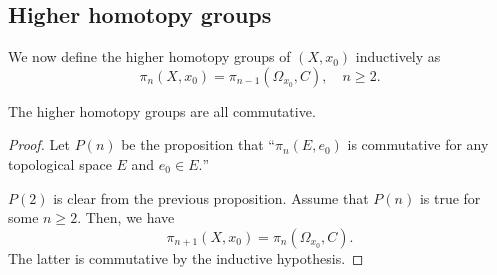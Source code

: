 \documentclass[12pt]{article}
\begin{document}
\subsection{Higher homotopy groups}

\begin{defn}
	We now define the higher homotopy groups of $(X, x_0)$ inductively as
	\begin{equation*} 
		\pi_n(X, x_0) = \pi_{n - 1}(\Omega_{x_0}, C), \quad n \ge 2.
	\end{equation*}
\end{defn}

\begin{cor}
	The higher homotopy groups are all commutative.
\end{cor}
\begin{proof} 
	Let $P(n)$ be the proposition that ``$\pi_n(E, e_0)$ is commutative for any topological space $E$ and $e_0 \in E.$''

	$P(2)$ is clear from the previous proposition. Assume that $P(n)$ is true for some $n \ge 2.$ Then, we have
	\begin{equation*} 
		\pi_{n+1}(X, x_0) = \pi_{n}(\Omega_{x_0}, C).
	\end{equation*}
	The latter is commutative by the inductive hypothesis.
\end{proof}
\end{document}

